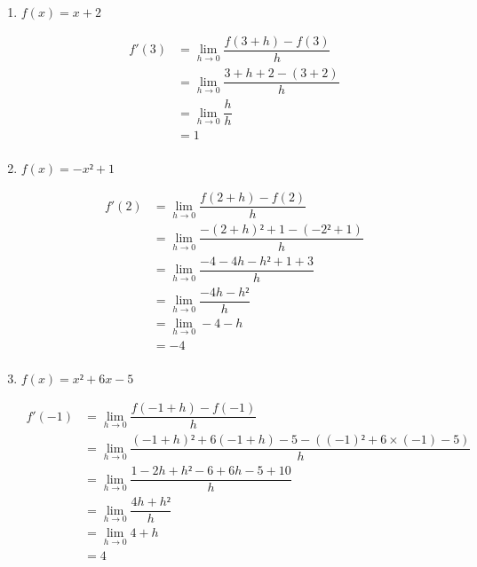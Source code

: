 \documentclass[
	classe=$1^{ere}STI2D$,
]{évaluation}
\begin{document}
\begin{exercice}
	\begin{enumerate}
		\item $f(x) = x + 2$

		      \begin{align*}
			      f'(3) & = \lim_{h→0} \dfrac{f(3+h) - f(3)}{h}       \\
			            & = \lim_{h→0} \dfrac{3 + h + 2 - (3 + 2)}{h} \\
			            & = \lim_{h→0} \dfrac{h}{h}                   \\
			            & = 1                                         \\
		      \end{align*}
		\item $f(x) = -x² + 1$

		      \begin{align*}
			      f'(2) & = \lim_{h→0} \dfrac{f(2+h) - f(2)}{h}             \\
			            & = \lim_{h→0} \dfrac{-(2 + h)² + 1 - (-2² + 1)}{h} \\
			            & = \lim_{h→0} \dfrac{-4 - 4h - h² + 1 + 3}{h}      \\
			            & = \lim_{h→0} \dfrac{-4h - h²}{h}                  \\
			            & = \lim_{h→0} -4 - h                               \\
			            & = -4                                              \\
		      \end{align*}
		\item $f(x) = x² + 6x - 5$

		      \begin{align*}
			      f'(-1) & = \lim_{h→0} \dfrac{f(-1+h) - f(-1)}{h}                                  \\
			             & = \lim_{h→0} \dfrac{(-1 + h)² + 6(-1 + h) - 5 - ((-1)² + 6×(-1) - 5)}{h} \\
			             & = \lim_{h→0} \dfrac{1 - 2h + h² - 6 + 6h - 5 + 10}{h}                    \\
			             & = \lim_{h→0} \dfrac{4h + h²}{h}                                         \\
			             & = \lim_{h→0} 4 + h                                                      \\
			             & = 4                                                                    \\
		      \end{align*}
	\end{enumerate}
\end{exercice}
\end{document}

